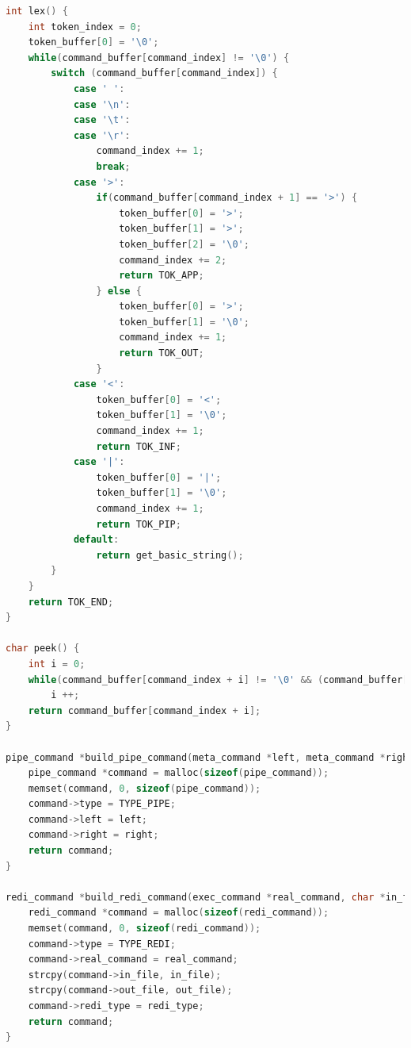 \documentclass[blue,normal,cn]{elegantnote}
\begin{document}
\begin{lstlisting}[language=C]
int lex() {
    int token_index = 0;
    token_buffer[0] = '\0';
    while(command_buffer[command_index] != '\0') {
        switch (command_buffer[command_index]) {
            case ' ':
            case '\n':
            case '\t':
            case '\r':
                command_index += 1;
                break;
            case '>':
                if(command_buffer[command_index + 1] == '>') {
                    token_buffer[0] = '>';
                    token_buffer[1] = '>';
                    token_buffer[2] = '\0';
                    command_index += 2;
                    return TOK_APP;
                } else {
                    token_buffer[0] = '>';
                    token_buffer[1] = '\0';
                    command_index += 1;
                    return TOK_OUT;
                }
            case '<':
                token_buffer[0] = '<';
                token_buffer[1] = '\0';
                command_index += 1;
                return TOK_INF;
            case '|':
                token_buffer[0] = '|';
                token_buffer[1] = '\0';
                command_index += 1;
                return TOK_PIP;
            default:
                return get_basic_string();
        }
    }
    return TOK_END;
}

char peek() {
    int i = 0;
    while(command_buffer[command_index + i] != '\0' && (command_buffer[command_index + i] == ' ' || command_buffer[command_index + i] == '\t'))
        i ++;
    return command_buffer[command_index + i];
}

pipe_command *build_pipe_command(meta_command *left, meta_command *right) {
    pipe_command *command = malloc(sizeof(pipe_command));
    memset(command, 0, sizeof(pipe_command));
    command->type = TYPE_PIPE;
    command->left = left;
    command->right = right;
    return command;
}

redi_command *build_redi_command(exec_command *real_command, char *in_file, char *out_file, int redi_type) {
    redi_command *command = malloc(sizeof(redi_command));
    memset(command, 0, sizeof(redi_command));
    command->type = TYPE_REDI;
    command->real_command = real_command;
    strcpy(command->in_file, in_file);
    strcpy(command->out_file, out_file);
    command->redi_type = redi_type;
    return command;
}


\end{lstlisting}
\end{document}
